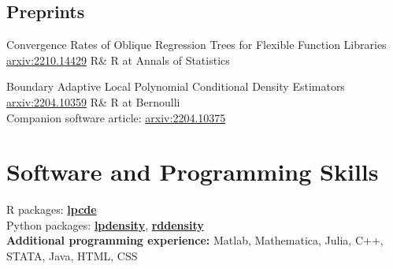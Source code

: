 \documentclass[10pt,a4paper,roman]{moderncv}        %
\begin{document}
\subsection{Preprints}
{Convergence Rates of Oblique Regression Trees for Flexible Function Libraries}
{\color{blue} \href{https://arxiv.org/abs/2210.14429}{arxiv:2210.14429} \color{black}}
{}{R\& R at Annals of Statistics}

{Boundary Adaptive Local Polynomial Conditional Density Estimators}
{\color{blue}\href{https://arxiv.org/abs/2204.10359}{arxiv:2204.10359}\color{black}}{}
{R\& R at Bernoulli
  \\
  Companion software article: \color{blue}\href{https://arxiv.org/abs/2204.10375}{arxiv:2204.10375}\color{black}}


\vspace{-0.2cm}
\section{Software and Programming Skills}
R packages:
\color{blue}\href{https://nppackages.github.io/lpcde/}{\textbf{lpcde}}\color{black}
\\
Python packages: \color{blue}\href{https://nppackages.github.io/lpdensity_doc/}
{\textbf{lpdensity}}\color{black},
\color{blue}\href{https://rdpackages.github.io/rddensity_doc/}
{\textbf{rddensity}}\color{black}
\\
\textbf{Additional programming experience:}
Matlab, Mathematica, Julia, C++, STATA, Java, HTML, CSS

\end{document}
